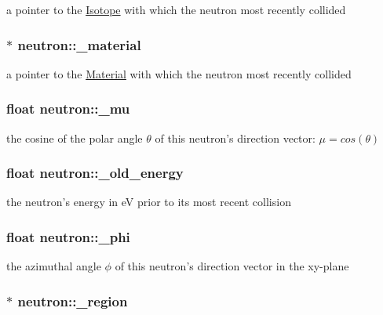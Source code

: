 a pointer to the \hyperlink{classIsotope}{Isotope} with which the neutron most recently collided \hypertarget{structneutron_a7af200a58de9f8c535c1247053f70872}{
\subsubsection[{\-\_\-material}]{$\ast$ neutron\-::\-\_\-material}}\label{structneutron_a7af200a58de9f8c535c1247053f70872}
a pointer to the \hyperlink{classMaterial}{Material} with which the neutron most recently collided \hypertarget{structneutron_ad0addd2c6b874a54d838455358e7f6e8}{
\subsubsection[{\-\_\-mu}]{\setlength{\rightskip}{0pt plus 5cm}float neutron\-::\-\_\-mu}}\label{structneutron_ad0addd2c6b874a54d838455358e7f6e8}
the cosine of the polar angle $\theta$ of this neutron's direction vector\-: $\mu = cos(\theta)$ \hypertarget{structneutron_a7f4a5f782cd613aed5b7832a198ffce2}{
\subsubsection[{\-\_\-old\-\_\-energy}]{\setlength{\rightskip}{0pt plus 5cm}float neutron\-::\-\_\-old\-\_\-energy}}\label{structneutron_a7f4a5f782cd613aed5b7832a198ffce2}
the neutron's energy in e\-V prior to its most recent collision \hypertarget{structneutron_ac17d30fc4c24666fcab05fe3d787b32d}{
\subsubsection[{\-\_\-phi}]{\setlength{\rightskip}{0pt plus 5cm}float neutron\-::\-\_\-phi}}\label{structneutron_ac17d30fc4c24666fcab05fe3d787b32d}
the azimuthal angle $\phi$ of this neutron's direction vector in the xy-\/plane \hypertarget{structneutron_ae09eb9ff92ce5578e2e683bc27e61e3b}{
\subsubsection[{\-\_\-region}]{$\ast$ neutron\-::\-\_\-region}}\label{structneutron_ae09eb9ff92ce5578e2e683bc27e61e3b}
